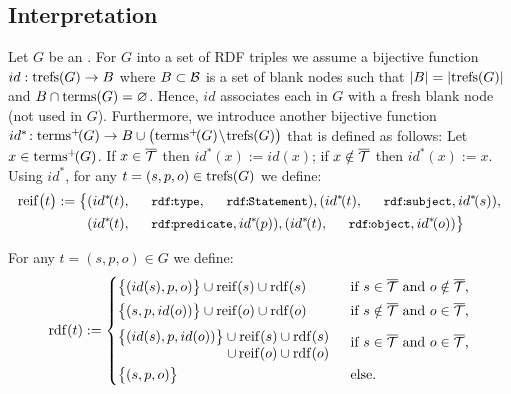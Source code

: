 
\subsection{Interpretation}

Let $G$ be an {\RDFplusGraph}. For  $G$ into a set of RDF triples we assume a bijective function $id : \mathrm{trefs}(G) \rightarrow B$ where $B \subset \mathcal{B}$ is a set of blank nodes such that $| B | = | \mathrm{trefs}(G) |$ and $B \cap \mathrm{terms}(G) = \varnothing$. Hence, $id$ associates each {\TRef} in $G$ with a fresh blank node (not used in $G$). Furthermore, we introduce
	another bijective function $id^*\! : \mathrm{terms}^+\!(G) \rightarrow B \cup \bigl( \mathrm{terms}^+\!(G) \!\setminus\! \mathrm{trefs}(G) \bigr)$
that is defined as follows: Let $x \in \mathrm{terms}^+\!(G)$. If $x \in \overline{\mathcal{T}}$ then $id^*\!(x) := id(x)$; if $x \notin \overline{\mathcal{T}}$ then $id^*\!(x) := x$.
%
Using $id^*$, for any $t = (s,p,o) \in \mathrm{trefs}(G)$ we define:
\begin{align*}
	\mathrm{reif}\bigl( t \bigr) := \big\lbrace
		& (id^*\!(t),\mathTinyRDF{rdf\!:\!type},\mathTinyRDF{rdf\!:\!Statement}),
		(id^*\!(t),\mathTinyRDF{rdf\!:\!subject},id^*\!(s)), \\
		& (id^*\!(t),\mathTinyRDF{rdf\!:\!predicate},id^*\!(p)),
		(id^*\!(t),\mathTinyRDF{rdf\!:\!object},id^*\!(o))
	\big\rbrace
\end{align*}

\noindent
For any {\RDFplusTriple} $t = (s,p,o) \in G$ we define:
\begin{equation*}
	\fctDescent{t} := \begin{cases}
\vspace{1mm}
		\big\lbrace (id(s),p,o) \big\rbrace \cup \mathrm{reif}(s) \cup \fctDescent{s} & \text{if $s \in \symAllTriples$ and $o \notin \symAllTriples$,} \\
\vspace{1mm}
		\big\lbrace (s,p,id(o)) \big\rbrace \cup \mathrm{reif}(o) \cup \fctDescent{o} & \text{if $s \notin \symAllTriples$ and $o \in \symAllTriples$,} \\
\vspace{1mm}
		\begin{minipage}[c]{55mm}\vspace{1mm}
			$\big\lbrace (id(s),p,id(o)) \big\rbrace \cup \mathrm{reif}(s) \cup \fctDescent{s}$ \\
			\hspace*{27.5mm}$\cup \, \mathrm{reif}(o) \cup \fctDescent{o}$
		\end{minipage} & \text{if $s \in \symAllTriples$ and $o \in \symAllTriples$,} \\
		\big\lbrace (s,p,o) \big\rbrace & \text{else} .
\end{cases}
\end{equation*}

